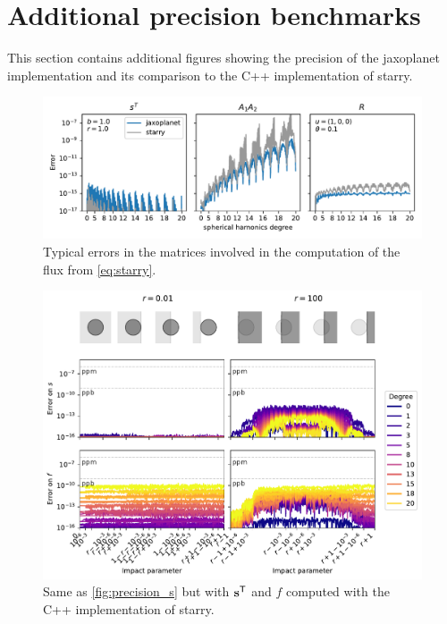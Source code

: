 \documentclass[modern]{aastex631}
\begin{document}
\section{Additional precision benchmarks}\label{precise_precision}
This section contains additional figures showing the precision of the \textsf{jaxoplanet} implementation and its comparison to the C++ implementation of \textsf{starry}.
\begin{figure}[H]
    \begin{center}
        \includegraphics[width=\textwidth]{../workflows/figures/error_SAR.pdf}
        \caption{Typical errors in the matrices involved in the computation of the flux from \autoref{eq:starry}. }
        \label{fig:precision_SAR}
    \end{center}
\end{figure}
\begin{figure}[H]
    \begin{center}
        \includegraphics[width=\textwidth]{../workflows/figures/error_starry.pdf}
        \caption{Same as \autoref{fig:precision_s} but with ${\mathbf{s}}^\mathsf{T}$ and $f$ computed with the C++ implementation of \textsf{starry}. }
        \label{fig:precision_s_starry}
    \end{center}
\end{figure}
\end{document}
